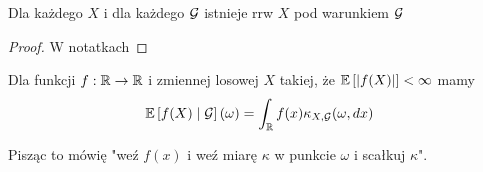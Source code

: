 \begin{theorem}
  Dla każdego $X$ i dla każdego $\mathcal{G}$ istnieje rrw $X$ pod warunkiem $\mathcal{G}$
\end{theorem}

\begin{proof}
  W notatkach
\end{proof}

\begin{fact}\label{fakt 3.5}
  Dla funkcji $f:\operatorname{\mathbb{R}}\to\operatorname{\mathbb{R}}$ i zmiennej losowej $X$ takiej, że $\expected{|f(X)|}<\infty$ mamy
  $$\expected{f(X)}{\set{G}}(\omega)=\int_{\R} f(x)\kappa_{X,\set{G}}(\omega,dx)$$
\end{fact}

Pisząc to mówię "weź $f(x)$ i weź miarę $\kappa$ w punkcie $\omega$ i scałkuj $\kappa$".

